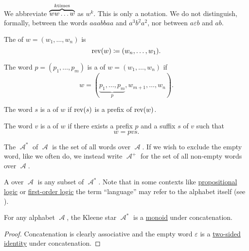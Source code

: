 \begin{definition}
\begin{thmenum}
    We abbreviate \( \overbrace{w w \ldots w}^{k \T{times}} \) as \( w^k \). This is only a notation. We do not distinguish, formally, between the words \( aaabbaa \) and \( a^3 b^2 a^2 \), nor between \( a \varepsilon b \) and \( ab \).

     The  of \( w = (w_1, \ldots, w_n) \) is
    \begin{equation*}
      \operatorname{rev}(w) \coloneqq (w_n, \ldots, w_1).
    \end{equation*}

     The word \( p = (p_1, \ldots, p_m) \) is a  of \( w = (w_1, \ldots, w_n) \) if
    \begin{equation*}
      w = (\underbrace{p_1, \ldots, p_m}_p, w_{m+1}, \ldots, w_n).
    \end{equation*}

     The word \( s \) is a  of \( w \) if \( \operatorname{rev}(s) \) is a prefix of \( \operatorname{rev}(w) \).

     The word \( v \) is a  of \( w \) if there exists a prefix \( p \) and a suffix \( s \) of \( v \) such that
    \begin{equation*}
      w = pvs.
    \end{equation*}

     The  \( \mscrA^* \) of \( \mscrA \) is the set of all words over \( \mscrA \). If we wish to exclude the empty word, like we often do, we instead write \( \mscrA^+ \) for the set of all non-empty words over \( \mscrA \).

     A  over \( \mscrA \) is any subset of \( \mscrA^* \). Note that in some contexts like \hyperref[subsec:propositional_logic]{propositional logic} or \hyperref[subsec:first_order_logic]{first-order logic} the term \enquote{language} may refer to the alphabet itself (see ).
  \end{thmenum}
\end{definition}

\begin{proposition}\label{thm:kleene_star_is_monoid}
  For any alphabet \( \mscrA \), the Kleene star \( \mscrA^* \) is a \hyperref[def:monoid]{monoid} under concatenation.
\end{proposition}
\begin{proof}
  Concatenation is clearly associative and the empty word \( \varepsilon \) is a \hyperref[def:magma_identity]{two-sided identity} under concatenation.
\end{proof}

